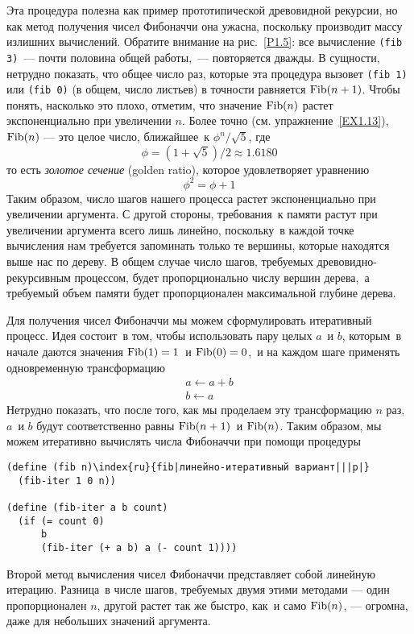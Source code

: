 Эта процедура полезна как пример прототипической
древовидной рекурсии, но как метод получения чисел Фибоначчи она ужасна,
поскольку производит массу излишних вычислений.  Обратите внимание на
рис.~\ref{P1.5}: все вычисление {\tt (fib 3)}~--- почти половина общей 
работы,~--- повторяется дважды. В сущности,
нетрудно показать, что общее число раз, которые эта процедура вызовет
{\tt (fib~1)} или {\tt (fib~0)} (в общем, число листьев) 
в точности равняется $\mathop{\rm Fib}(n + 1)$. Чтобы понять,
насколько это плохо, отметим, что значение $\mathop{\rm
Fib}(n)$ 
растет экспоненциально при увеличении
$n$. Более точно (см. упражнение~\ref{EX1.13}),
$\mathop{\rm Fib}(n)$ --- это целое число, ближайшее~к 
$\phi^n / \sqrt{5}$, где
$$
\phi = (1 + \sqrt{5}) / 2 \approx 1.6180
$$
то есть %
%
{\em золотое сечение} (golden ratio), которое
удовлетворяет уравнению
$$
\phi^2 = \phi + 1
$$
Таким образом, число шагов нашего процесса растет экспоненциально
при увеличении аргумента. С другой стороны, требования~к памяти
растут при увеличении аргумента всего лишь линейно, поскольку~в каждой 
точке вычисления нам требуется запоминать только те вершины, которые
находятся выше нас по дереву. В общем случае число шагов, требуемых
древовидно-рекурсивным процессом, будет пропорционально числу вершин
дерева,~а требуемый объем памяти будет пропорционален максимальной
глубине дерева.

Для получения чисел Фибоначчи мы можем сформулировать
итеративный процесс.  Идея состоит~в том, чтобы использовать пару целых
$a$~и $b$, которым~в начале даются
значения $\mathop{\rm Fib}(1) = 1$~и $\mathop{\rm
Fib}(0) = 0$,~и на каждом шаге применять одновременную
трансформацию
$$
\begin{array}{l}
 a \gets a + b \\
 b \gets a
\end{array}
$$
Нетрудно показать, что после того, как мы проделаем эту трансформацию
$n$ раз, $a$~и $b$ будут
соответственно равны $\mathop{\rm Fib}(n + 1)$~и 
$\mathop{\rm Fib}(n)$.  Таким образом, мы можем итеративно
вычислять числа Фибоначчи при помощи процедуры

\begin{Verbatim}[fontsize=\small]
(define (fib n)\index{ru}{fib|линейно-итеративный вариант|||p|}
  (fib-iter 1 0 n))

(define (fib-iter a b count)
  (if (= count 0)
      b
      (fib-iter (+ a b) a (- count 1))))
\end{Verbatim}
Второй метод вычисления чисел Фибоначчи представляет собой линейную
итерацию.  Разница~в числе шагов, требуемых двумя этими методами ---
один пропорционален $n$, другой растет так же быстро, как~и 
само $\mathop{\rm Fib}(n)$, --- огромна, даже для небольших 
значений аргумента.

